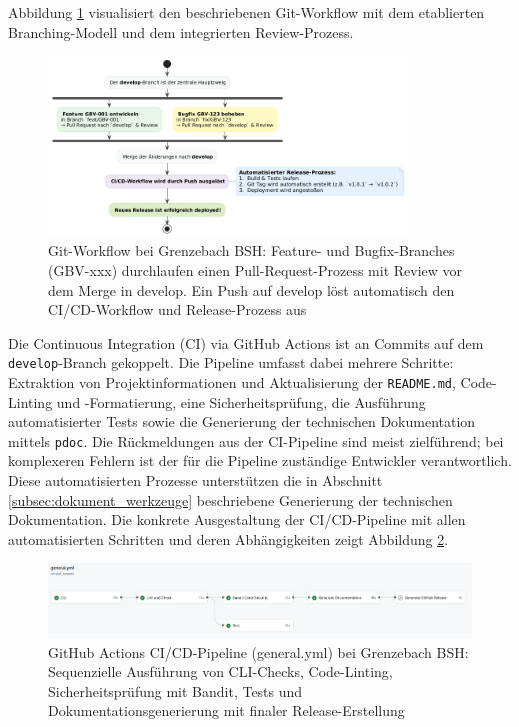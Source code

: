 \documentclass[12pt,oneside]{article}
\begin{document}
    Abbildung \ref{fig:git_branching} visualisiert den beschriebenen Git-Workflow mit dem etablierten Branching-Modell und dem integrierten Review-Prozess.

    \begin{figure}[H]
        \centering
        \includegraphics[width=0.85\textwidth]{images/git_branching}
        \caption{Git-Workflow bei Grenzebach BSH: Feature- und Bugfix-Branches (GBV-xxx) durchlaufen einen Pull-Request-Prozess mit Review vor dem Merge in develop. Ein Push auf develop löst automatisch den CI/CD-Workflow und Release-Prozess aus}
        \label{fig:git_branching}
    \end{figure}
    \noindent
    Die Continuous Integration (CI) via GitHub Actions ist an Commits auf dem \texttt{develop}-Branch gekoppelt. Die Pipeline umfasst dabei mehrere Schritte: Extraktion von Projektinformationen und Aktualisierung der \texttt{README.md}, Code-Linting und -Formatierung, eine Sicherheitsprüfung, die Ausführung automatisierter Tests sowie die Generierung der technischen Dokumentation mittels \texttt{pdoc}. Die Rückmeldungen aus der CI-Pipeline sind meist zielführend; bei komplexeren Fehlern ist der für die Pipeline zuständige Entwickler verantwortlich. Diese automatisierten Prozesse unterstützen die in Abschnitt \ref{subsec:dokument_werkzeuge} beschriebene Generierung der technischen Dokumentation.
    \noindent
    Die konkrete Ausgestaltung der CI/CD-Pipeline mit allen automatisierten Schritten und deren Abhängigkeiten zeigt Abbildung \ref{fig:git_workflow}.

    \begin{figure}[H]
        \centering
        \includegraphics[width=1.0\textwidth]{images/git_workflow}
        \caption{GitHub Actions CI/CD-Pipeline (general.yml) bei Grenzebach BSH: Sequenzielle Ausführung von CLI-Checks, Code-Linting, Sicherheitsprüfung mit Bandit, Tests und Dokumentationsgenerierung mit finaler Release-Erstellung}
        \label{fig:git_workflow}
    \end{figure}
\end{document}
